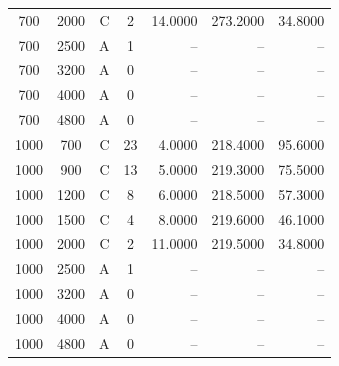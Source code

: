\begin{longtable}{ccrcrrr}
700 & 2000 & C & 2 & 14.0000 & 273.2000 & 34.8000 \\
700 & 2500 & A & 1 & -- & -- & -- \\
700 & 3200 & A & 0 & -- & -- & -- \\
700 & 4000 & A & 0 & -- & -- & -- \\
700 & 4800 & A & 0 & -- & -- & -- \\
1000 & 700 & C & 23 & 4.0000 & 218.4000 & 95.6000 \\
1000 & 900 & C & 13 & 5.0000 & 219.3000 & 75.5000 \\
1000 & 1200 & C & 8 & 6.0000 & 218.5000 & 57.3000 \\
1000 & 1500 & C & 4 & 8.0000 & 219.6000 & 46.1000 \\
1000 & 2000 & C & 2 & 11.0000 & 219.5000 & 34.8000 \\
1000 & 2500 & A & 1 & -- & -- & -- \\
1000 & 3200 & A & 0 & -- & -- & -- \\
1000 & 4000 & A & 0 & -- & -- & -- \\
1000 & 4800 & A & 0 & -- & -- & -- \\
\bottomrule
\end{longtable}

